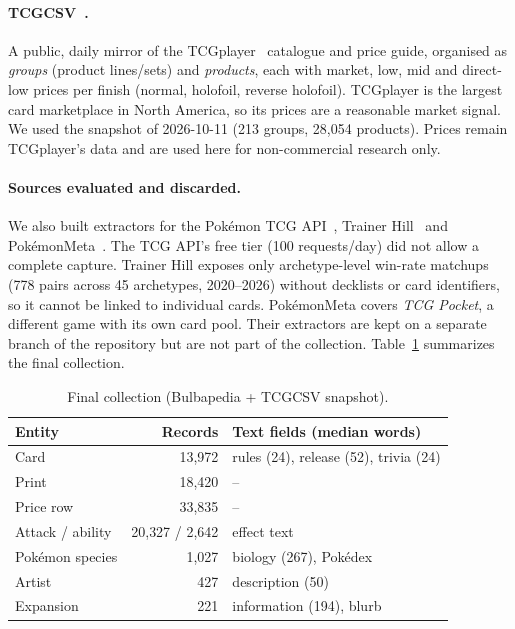 \documentclass[sigconf]{acmart}
\begin{document}
  \paragraph{TCGCSV~\cite{tcgcsv}.}
  A public, daily mirror of the TCGplayer~\cite{tcgplayer} catalogue and price
  guide, organised as \emph{groups} (product lines/sets) and \emph{products},
  each with market, low, mid and direct-low prices per finish (normal,
  holofoil, reverse holofoil). TCGplayer is the largest card marketplace in
  North America, so its prices are a reasonable market signal. We used the
  snapshot of 2026-10-11 (213 groups, 28{,}054 products). Prices remain
  TCGplayer's data and are used here for non-commercial research only.

  \paragraph{Sources evaluated and discarded.}
  We also built extractors for the Pok\'emon TCG API~\cite{pokemontcgapi},
  Trainer Hill~\cite{trainerhill} and Pok\'emonMeta~\cite{pokemonmeta}.
  The TCG API's free tier (100 requests/day) did not allow a complete
  capture. Trainer Hill exposes only archetype-level win-rate matchups
  (778 pairs across 45 archetypes, 2020--2026) without decklists or card
  identifiers, so it cannot be linked to individual cards. Pok\'emonMeta
  covers \emph{TCG Pocket}, a different game with its own card pool.
  Their extractors are kept on a separate branch of the repository but
  are not part of the collection.
  Table~\ref{tab:collection} summarizes the final collection.

  \begin{table}[ht]
      \centering
      \caption{Final collection (Bulbapedia + TCGCSV snapshot).}
      \label{tab:collection}
      \small
      \setlength{\tabcolsep}{4pt}
      \begin{tabular}{lrl}
          \hline
          \textbf{Entity} & \textbf{Records} & \textbf{Text fields (median words)} \\
          \hline
          Card & 13{,}972 & rules (24), release (52), trivia (24) \\
          Print & 18{,}420 & -- \\
          Price row & 33{,}835 & -- \\
          Attack / ability & 20{,}327 / 2{,}642 & effect text \\
          Pok\'emon species & 1{,}027 & biology (267), Pok\'edex \\
          Artist & 427 & description (50) \\
          Expansion & 221 & information (194), blurb \\
          \hline
      \end{tabular}
  \end{table}
\end{document}
